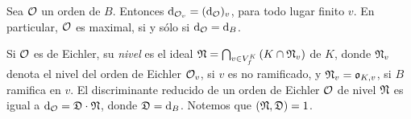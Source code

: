 \begin{coroDiscriminante}\label{coro:discriminante}
	Sea $\cal{O}$ un orden de $B$. Entonces
	$\drd{\cal{O}_{v}}=(\drd{\cal{O}})_{v}$, para todo lugar finito $v$. En
	particular, $\cal{O}$ es maximal, si y s\'{o}lo si
	$\drd{\cal{O}}=\drd{B}$.
\end{coroDiscriminante}
%

Si $\cal{O}$ es de Eichler, su \emph{nivel}
es el ideal $\frak{N}=\bigcap_{v\in\lugares[f]{K}}\,(K\cap\frak{N}_{v})$ de
$K$, donde $\frak{N}_{v}$ denota el nivel del orden de Eichler $\cal{O}_{v}$,
si $v$ es no ramificado, y $\frak{N}_{v}=\oka{K,v}$, si $B$ ramifica en $v$.
El discriminante reducido de un orden de Eichler $\cal{O}$ de nivel $\frak{N}$
es igual a $\drd{\cal{O}}=\frak{D}\cdot\frak{N}$, donde $\frak{D}=\drd{B}$.
Notemos que $(\frak{N},\frak{D})=1$.

% 
